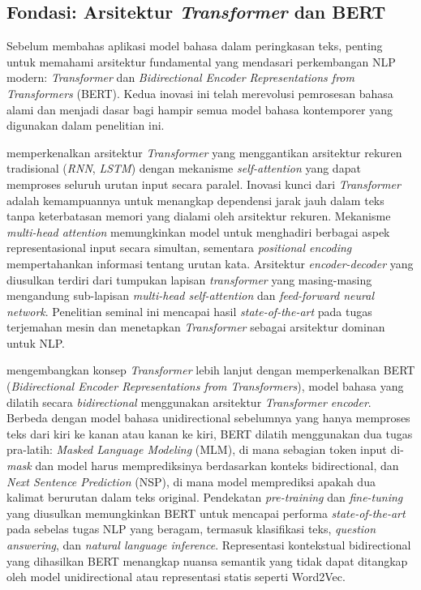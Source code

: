 \subsection{Fondasi: Arsitektur \textit{Transformer} dan BERT}

Sebelum membahas aplikasi model bahasa dalam peringkasan teks, penting untuk memahami arsitektur fundamental yang mendasari perkembangan NLP modern: \textit{Transformer} dan \textit{Bidirectional Encoder Representations from Transformers} (BERT). Kedua inovasi ini telah merevolusi pemrosesan bahasa alami dan menjadi dasar bagi hampir semua model bahasa kontemporer yang digunakan dalam penelitian ini.

\textcite{vaswani2017} memperkenalkan arsitektur \textit{Transformer} yang menggantikan arsitektur rekuren tradisional (\textit{RNN}, \textit{LSTM}) dengan mekanisme \textit{self-attention} yang dapat memproses seluruh urutan input secara paralel. Inovasi kunci dari \textit{Transformer} adalah kemampuannya untuk menangkap dependensi jarak jauh dalam teks tanpa keterbatasan memori yang dialami oleh arsitektur rekuren. Mekanisme \textit{multi-head attention} memungkinkan model untuk menghadiri berbagai aspek representasional input secara simultan, sementara \textit{positional encoding} mempertahankan informasi tentang urutan kata. Arsitektur \textit{encoder-decoder} yang diusulkan terdiri dari tumpukan lapisan \textit{transformer} yang masing-masing mengandung sub-lapisan \textit{multi-head self-attention} dan \textit{feed-forward neural network}. Penelitian seminal ini mencapai hasil \textit{state-of-the-art} pada tugas terjemahan mesin dan menetapkan \textit{Transformer} sebagai arsitektur dominan untuk NLP.

\textcite{devlin2019} mengembangkan konsep \textit{Transformer} lebih lanjut dengan memperkenalkan BERT (\textit{Bidirectional Encoder Representations from Transformers}), model bahasa yang dilatih secara \textit{bidirectional} menggunakan arsitektur \textit{Transformer encoder}. Berbeda dengan model bahasa unidirectional sebelumnya yang hanya memproses teks dari kiri ke kanan atau kanan ke kiri, BERT dilatih menggunakan dua tugas pra-latih: \textit{Masked Language Modeling} (MLM), di mana sebagian token input di-\textit{mask} dan model harus memprediksinya berdasarkan konteks bidirectional, dan \textit{Next Sentence Prediction} (NSP), di mana model memprediksi apakah dua kalimat berurutan dalam teks original. Pendekatan \textit{pre-training} dan \textit{fine-tuning} yang diusulkan memungkinkan BERT untuk mencapai performa \textit{state-of-the-art} pada sebelas tugas NLP yang beragam, termasuk klasifikasi teks, \textit{question answering}, dan \textit{natural language inference}. Representasi kontekstual bidirectional yang dihasilkan BERT menangkap nuansa semantik yang tidak dapat ditangkap oleh model unidirectional atau representasi statis seperti Word2Vec.


